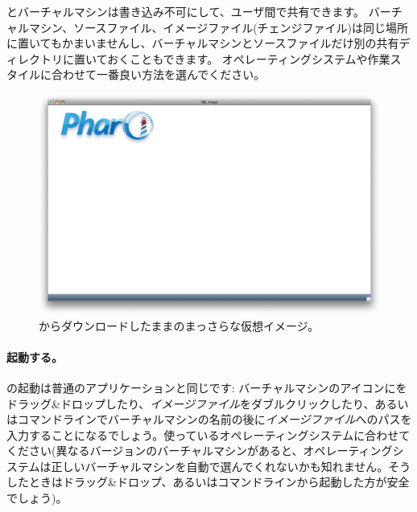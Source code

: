 \documentclass[a4paper,10pt,twoside]{book}
\begin{document}
とバーチャルマシンは書き込み不可にして、ユーザ間で共有できます。
バーチャルマシン、ソースファイル、イメージファイル(チェンジファイル)は同じ場所に置いてもかまいませんし、バーチャルマシンとソースファイルだけ別の共有ディレクトリに置いておくこともできます。
オペレーティングシステムや作業スタイルに合わせて一番良い方法を選んでください。


\begin{figure}[htb]
\centerline {\includegraphics[width=\textwidth]{startup}}
\caption{\pbe からダウンロードしたままのまっさらな仮想イメージ。}
\end{figure}

\paragraph{起動する。} \pharo の起動は普通のアプリケーションと同じです: バーチャルマシンのアイコンにをドラッグ\&ドロップしたり、\emph{イメージファイル}をダブルクリックしたり、あるいはコマンドラインでバーチャルマシンの名前の後に\emph{イメージファイル}へのパスを入力することになるでしょう。使っているオペレーティングシステムに合わせてください(異なるバージョンのバーチャルマシンがあると、オペレーティングシステムは正しいバーチャルマシンを自動で選んでくれないかも知れません。そうしたときはドラッグ\&ドロップ、あるいはコマンドラインから起動した方が安全でしょう)。
\end{document}

